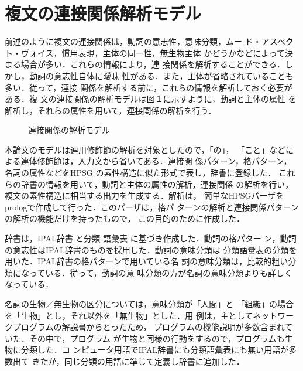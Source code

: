 \section{複文の連接関係解析モデル}
前述のように複文の連接関係は，動詞の意志性，意味分類，ムー
ド・アスペクト・ヴォイス，慣用表現，主体の同一性，無生物主体
かどうかなどによって決まる場合が多い．これらの情報により，連
接関係を解析することができる．しかし，動詞の意志性自体に曖昧
性がある．また，主体が省略されていることも多い．従って，連接
関係を解析する前に，これらの情報を解析しておく必要がある．複
文の連接関係の解析モデルは図１に示すように，動詞と主体の属性
を解析し，それらの属性を用いて，連接関係の解析を行う．
\vspace*{2mm}
\begin{figure}[htbp]
  \begin{center}
    
    \bigskip

    \caption{連接関係の解析モデル}
    \label{fig:1}
  \end{center}
\end{figure}

本論文のモデルは連用修飾節の解析を対象としたので，「の」，
「こと」などによる連体修飾節は，入力文から省いてある．連接関
係パターン，格パターン，名詞の属性などをHPSG\cite[など]{PollardAndSag1987,PollardAndSag1993} 
の素性構造に似た形式で表し，辞書に登録した．
これらの辞書の情報を用いて，動詞と主体の属性の解析，連接関係
の解析を行い，複文の素性構造に相当する出力を生成する．解析は，
簡単なHPSGパーザをprologで作成して行った．このパーザは，格パ
ターンの解析と連接関係パターンの解析の機能だけを持ったもので，
この目的のために作成した．

辞書は，IPAL辞書\cite[など]{IPA1987,IPA1990} と分類
語彙表\cite{Kokuritukokugokenkyujo1989} に基づき作成した．動詞の格パター
ン，動詞の意志性はIPAL辞書のものを採用した．動詞の意味分類は
分類語彙表の分類を用いた．IPAL辞書の格パターンで用いている名
詞の意味分類は，比較的粗い分類になっている．従って，動詞の意
味分類の方が名詞の意味分類よりも詳しくなっている．

名詞の生物／無生物の区分については，意味分類が「人間」と
「組織」の場合を「生物」とし，それ以外を「無生物」とした．用
例は，主としてネットワークプログラムの解説書からとったため，
プログラムの機能説明が多数含まれていた．その中で，プログラム
が生物と同様の行動をするので，プログラムも生物に分類した．コ
ンピュータ用語でIPAL辞書にも分類語彙表にも無い用語が多数出て
きたが，同じ分類の用語に準じて定義し辞書に追加した．

